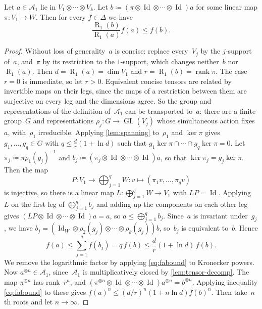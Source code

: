 \documentclass[11pt,letterpaper]{article}
\DeclareMathOperator{\tensorrank}{R}
\DeclareMathOperator{\GL}{GL}
\DeclareMathOperator{\Id}{Id}
\DeclareMathOperator{\rank}{rank} \DeclareMathOperator{\col}{colspan}
\begin{document}
\begin{lemma}\label{lem:restriction}
Let $a \in \mathcal{A}_1$ lie in $V_1 \otimes \cdots \otimes V_k$. Let $b \coloneqq (\pi \otimes \Id \otimes \cdots \otimes \Id)a$ for some linear map $\pi : V_1 \to W$. Then for every $f \in \Delta$ we have
\[
\frac{\tensorrank_1(b)}{\tensorrank_1(a)} f(a) \leq f(b).
\]
\end{lemma}
\begin{proof}
Without loss of generality~$a$ is concise: replace every~$V_j$ by the $j$-support of~$a$, and~$\pi$ by its restriction to the $1$-support, which changes neither~$b$ nor~$\tensorrank_1(a)$. Then $d = \tensorrank_1(a) = \dim V_1$ and $r = \tensorrank_1(b) = \rank \pi$. The case $r = 0$ is immediate, so let $r > 0$. Equivalent concise tensors are related by invertible maps on their legs, since the maps of a restriction between them are surjective on every leg and the dimensions agree. So the group and representations of the definition of~$\mathcal{A}_1$ can be transported to~$a$: there are a finite group~$G$ and representations $\rho_j : G \to \GL(V_j)$ whose simultaneous action fixes~$a$, with~$\rho_1$ irreducible. Applying \cref{lem:spanning} to~$\rho_1$ and $\ker \pi$ gives $g_1, \ldots, g_q \in G$ with $q \leq \frac{d}{r}(1 + \ln d)$ such that $g_1 \ker\pi \cap \cdots \cap g_q \ker\pi = 0$. Let $\pi_j \coloneqq \pi \rho_1(g_j)^{-1}$ and $b_j \coloneqq (\pi_j \otimes \Id \otimes \cdots \otimes \Id)a$, so that $\ker \pi_j = g_j \ker \pi$. Then the map
\[
P : V_1 \rightarrow \bigoplus_{j=1}^q W : v \mapsto (\pi_1 v, \ldots, \pi_q v)
\]
is injective, so there is a linear map $L : \bigoplus_{j=1}^q W \to V_1$ with $LP = \Id$. Applying~$L$ on the first leg of $\bigoplus_{j=1}^q b_j$ and adding up the components on each other leg gives $(LP \otimes \Id \otimes \cdots \otimes \Id)a = a$, so $a \leq \bigoplus_{j=1}^q b_j$. Since~$a$ is invariant under~$g_j$, we have $b_j = (\Id_W \otimes \rho_2(g_j) \otimes \cdots \otimes \rho_k(g_j))b$, so~$b_j$ is equivalent to~$b$. Hence
\begin{equation}\label{eq:fabound}
f(a) \leq \sum_{j=1}^q f(b_j) = q \, f(b) \leq \frac{d}{r} (1 + \ln d) \, f(b).
\end{equation}
We remove the logarithmic factor by applying \eqref{eq:fabound} to Kronecker powers. Now $a^{\otimes n} \in \mathcal{A}_1$, since~$\mathcal{A}_1$ is multiplicatively closed by \cref{lem:tensor-decomp}. The map $\pi^{\otimes n}$ has rank~$r^n$, and $(\pi^{\otimes n} \otimes \Id \otimes \cdots \otimes \Id) a^{\otimes n} = b^{\otimes n}$. Applying inequality \eqref{eq:fabound} to these gives $f(a)^n \leq (d/r)^n (1 + n \ln d) f(b)^n$. Then take~$n$th roots and let $n \to \infty$.
\end{proof}
\end{document}
